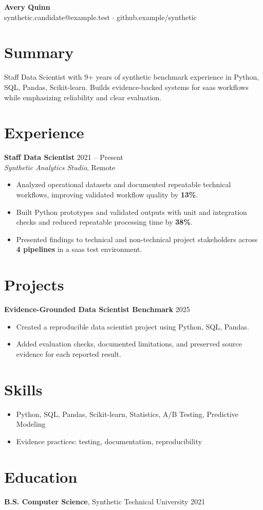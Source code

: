 \documentclass[10pt,letterpaper]{article}
\begin{document}
\begin{center}
{\Large \textbf{Avery Quinn}}\\
synthetic.candidate@example.test $\cdot$ github.example/synthetic
\end{center}

\section*{Summary}
Staff Data Scientist with 9+ years of synthetic benchmark experience in Python, SQL, Pandas, Scikit-learn. Builds evidence-backed systems for saas workflows while emphasizing reliability and clear evaluation.

\section*{Experience}
\textbf{Staff Data Scientist} \hfill 2021 -- Present\\
\textit{Synthetic Analytics Studio}, Remote
\begin{itemize}
  \item Analyzed operational datasets and documented repeatable technical workflows, improving validated workflow quality by \textbf{13\%}.
  \item Built Python prototypes and validated outputs with unit and integration checks and reduced repeatable processing time by \textbf{38\%}.
  \item Presented findings to technical and non-technical project stakeholders across \textbf{4 pipelines} in a saas test environment.
\end{itemize}

\section*{Projects}
\textbf{Evidence-Grounded Data Scientist Benchmark} \hfill 2025
\begin{itemize}
  \item Created a reproducible data scientist project using Python, SQL, Pandas.
  \item Added evaluation checks, documented limitations, and preserved source evidence for each reported result.
\end{itemize}

\section*{Skills}
\begin{itemize}
  \item Python, SQL, Pandas, Scikit-learn, Statistics, A/B Testing, Predictive Modeling
  \item Evidence practices: testing, documentation, reproducibility
\end{itemize}

\section*{Education}
\textbf{B.S. Computer Science}, Synthetic Technical University \hfill 2021
\end{document}
